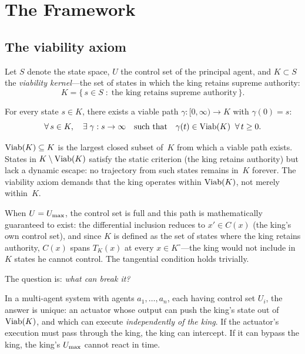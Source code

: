 \chapter{The Framework}\label{sec:framework}

\section{The viability axiom}\label{sec:axiom}

Let $S$ denote the state space, $U$ the control set of the principal
agent, and $K \subset S$ the \emph{viability kernel}---the set of states
in which the king retains supreme authority:
\[
  K = \bigl\{\, s \in S \;:\; \text{the king retains supreme authority}
  \,\bigr\}.
\]

\begin{axiom}[Viability]\label{ax:viability}
For every state $s \in K$, there exists a viable path
$\gamma: [0, \infty) \to K$ with $\gamma(0) = s$:
\[
  \forall\, s \in K,\quad
  \exists\;\gamma: s \to \infty
  \quad\text{such that}\quad
  \gamma(t) \in \mathrm{Viab}(K) \;\;\forall\, t \geq 0.
\]
\end{axiom}

\begin{remark}\label{rem:viab-subset}
$\mathrm{Viab}(K) \subseteq K$ is the largest closed subset of~$K$ from
which a viable path exists.  States in $K \setminus \mathrm{Viab}(K)$
satisfy the static criterion (the king retains authority) but
lack a dynamic escape: no trajectory from such states remains
in~$K$ forever.  The viability axiom demands that the king
operates within $\mathrm{Viab}(K)$, not merely within~$K$.
\end{remark}

When $U = U_{\max}$, the control set is full and this path is
mathematically guaranteed to exist: the differential inclusion
reduces to $x' \in C(x)$ (the king's own control set), and since
$K$ is defined as the set of states where the king retains
authority, $C(x)$ spans $T_K(x)$ at every
$x \in K^\circ$---the king would not include in $K$ states he
cannot control.  The tangential condition holds trivially.

The question is: \emph{what can break it?}

In a multi-agent system with agents $a_1, \ldots, a_n$, each having
control set $U_i$, the answer is unique: an actuator whose output can
push the king's state out of $\mathrm{Viab}(K)$, and which can execute
\emph{independently of the king}. If the actuator's execution must pass
through the king, the king can intercept. If it can bypass the king, the
king's $U_{\max}$ cannot react in time.

